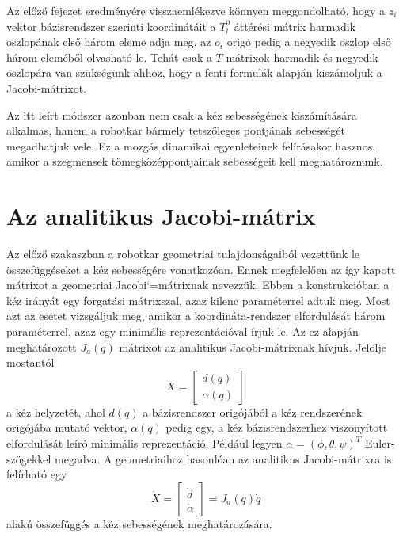 \documentclass[12pt,a4paper]{report}
\theoremstyle{remark}
\theoremstyle{definition}
\begin{document}
Az előző fejezet eredményére visszaemlékezve könnyen meggondolható, hogy a $z_i$ vektor bázisrendszer szerinti 
koordinátáit a $T^{0}_{i}$ áttérési mátrix harmadik oszlopának első három eleme adja meg, az $o_i$ origó pedig a 
negyedik oszlop első három eleméből olvasható le. Tehát csak a $T$ mátrixok harmadik és negyedik oszlopára van 
szükségünk ahhoz, hogy a fenti formulák alapján kiszámoljuk a Jacobi-mátrixot.

Az itt leírt módszer azonban nem csak a kéz sebességének kiszámítására alkalmas, hanem a robotkar bármely 
tetszőleges pontjának sebességét megadhatjuk vele. Ez a mozgás dinamikai egyenleteinek felírásakor hasznos, amikor a 
szegmensek tömegközéppontjainak sebességeit kell meghatároznunk.

\section{Az analitikus Jacobi-mátrix}
Az előző szakaszban a robotkar geometriai tulajdonságaiból vezettünk le összefüggéseket a kéz sebességére 
vonatkozóan. Ennek megfelelően az így kapott mátrixot a geometriai Jacobi`=mátrixnak nevezzük. Ebben a 
konstrukcióban a kéz irányát egy forgatási mátrixszal, azaz kilenc paraméterrel adtuk meg. Most azt az esetet 
vizsgáljuk meg, amikor a koordináta-rendszer elfordulását három paraméterrel, azaz egy minimális reprezentációval 
írjuk le. Az ez alapján meghatározott $J_a(q)$ mátrixot az analitikus Jacobi-mátrixnak hívjuk. Jelölje mostantól
\begin{equation}
X = \begin{bmatrix}
    d(q) \\ 
    \alpha(q)
    \end{bmatrix} 
\end{equation}
a kéz helyzetét, ahol $d(q)$ a bázisrendszer origójából a kéz rendszerének origójába mutató vektor, $\alpha(q)$ 
pedig egy, a kéz bázisrendszerhez viszonyított elfordulását leíró minimális reprezentáció. Például legyen 
$\alpha = (\phi, \theta, \psi)^T$ Euler-szögekkel megadva. A geometriaihoz hasonlóan az analitikus Jacobi-mátrixra 
is felírható egy
\begin{equation} \label{eq:analdefi}
\dot{X} = 
    \begin{bmatrix}
    \dot{d} \\ 
    \dot{\alpha}
    \end{bmatrix} = J_a(q)\dot{q}
\end{equation}
alakú összefüggés a kéz sebességének meghatározására.
\end{document}
